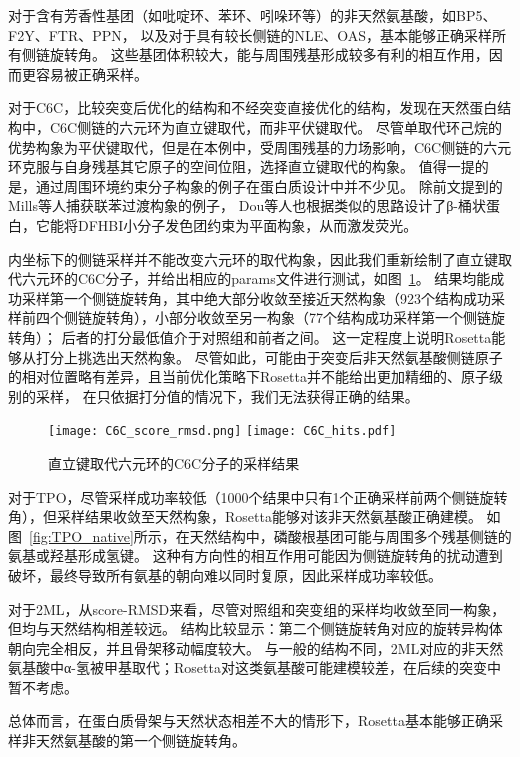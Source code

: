对于含有芳香性基团（如吡啶环、苯环、吲哚环等）的非天然氨基酸，如BP5、F2Y、FTR、PPN，
以及对于具有较长侧链的NLE、OAS，基本能够正确采样所有侧链旋转角。
这些基团体积较大，能与周围残基形成较多有利的相互作用，因而更容易被正确采样。

对于C6C，比较突变后优化的结构和不经突变直接优化的结构，发现在天然蛋白结构中，C6C侧链的六元环为直立键取代，而非平伏键取代。
尽管单取代环己烷的优势构象为平伏键取代，但是在本例中，受周围残基的力场影响，C6C侧链的六元环克服与自身残基其它原子的空间位阻，选择直立键取代的构象。
值得一提的是，通过周围环境约束分子构象的例子在蛋白质设计中并不少见。
除前文提到的Mills等人捕获联苯过渡构象的例子，
Dou等人也根据类似的思路设计了β-桶状蛋白，它能将DFHBI小分子发色团约束为平面构象，从而激发荧光。

内坐标下的侧链采样并不能改变六元环的取代构象，因此我们重新绘制了直立键取代六元环的C6C分子，并给出相应的params文件进行测试，如图~\ref{fig:C6C}。
结果均能成功采样第一个侧链旋转角，其中绝大部分收敛至接近天然构象（923个结构成功采样前四个侧链旋转角），小部分收敛至另一构象（77个结构成功采样第一个侧链旋转角）；
后者的打分最低值介于对照组和前者之间。
这一定程度上说明Rosetta能够从打分上挑选出天然构象。
尽管如此，可能由于突变后非天然氨基酸侧链原子的相对位置略有差异，且当前优化策略下Rosetta并不能给出更加精细的、原子级别的采样，
在只依据打分值的情况下，我们无法获得正确的结果。
\begin{figure}
  \centering
    {\texttt{[image: C6C\_score\_rmsd.png]}}
    {\texttt{[image: C6C\_hits.pdf]}}
  \caption{直立键取代六元环的C6C分子的采样结果}
  \label{fig:C6C}
\end{figure}


对于TPO，尽管采样成功率较低（1000个结果中只有1个正确采样前两个侧链旋转角），但采样结果收敛至天然构象，Rosetta能够对该非天然氨基酸正确建模。
如图~\ref{fig:TPO_native}所示，在天然结构中，磷酸根基团可能与周围多个残基侧链的氨基或羟基形成氢键。
这种有方向性的相互作用可能因为侧链旋转角的扰动遭到破坏，最终导致所有氨基的朝向难以同时复原，因此采样成功率较低。

对于2ML，从score-RMSD来看，尽管对照组和突变组的采样均收敛至同一构象，但均与天然结构相差较远。
结构比较显示：第二个侧链旋转角对应的旋转异构体朝向完全相反，并且骨架移动幅度较大。
与一般的结构不同，2ML对应的非天然氨基酸中α-氢被甲基取代；Rosetta对这类氨基酸可能建模较差，在后续的突变中暂不考虑。

总体而言，在蛋白质骨架与天然状态相差不大的情形下，Rosetta基本能够正确采样非天然氨基酸的第一个侧链旋转角。
